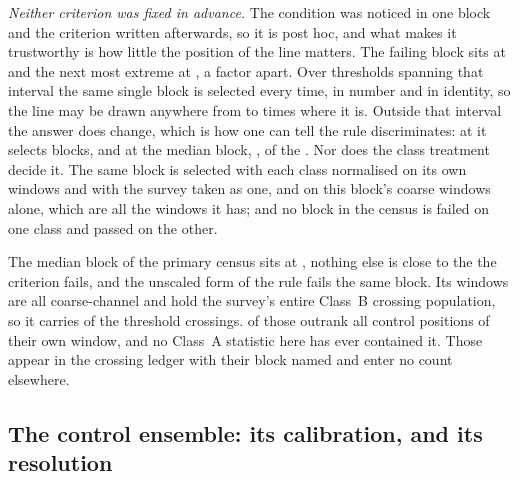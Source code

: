 \emph{Neither criterion was fixed in advance.} The condition was noticed in
one block and the criterion written afterwards, so it is post hoc, and what
makes it trustworthy is how little the position of the line matters. The
failing block sits at \BqFailQ{} and the next most extreme at \BqNextQ, a
factor \QsRatio{} apart. Over \QsNStep{} thresholds spanning that interval
the same single block is selected every time, in number and in identity, so
the line may be drawn anywhere from \QsMarginLo{} to \QsMarginHi{} times
where it is. Outside that interval the answer does change, which is how one
can tell the rule discriminates: at \BqNextQ{} it selects \QsNAtNext{}
blocks, and at the median block, \QsQMed, \QsNAtMed{} of the
\BqNBlocks. Nor does the class treatment decide it. The same block is
selected with each class normalised on its own windows and with the survey
taken as one, and on this block's \QsFailNWinB{} coarse windows alone, which
are all the windows it has; and no block in the census is failed on one class
and passed on the other.

The median block of the primary census sits at \BqQMed, nothing else is close
to the \BqNFail{} the criterion fails, and the unscaled form of the rule fails
the same \BqRawNFail{} block. Its \BqFailNWin{} windows are all
coarse-channel and
hold the survey's entire Class~B crossing population, so it carries
\EvNCrossFlag{} of the \EvNCrossRaw{} threshold crossings. \EvNRankFlag{}
of those outrank all \NCtrl{} control positions of their own window, and
no Class~A statistic here has ever contained it. Those \EvNCrossFlag{} appear
in the crossing ledger with their block named and enter no count
elsewhere.

\subsection{The control ensemble: its calibration, and its resolution}

